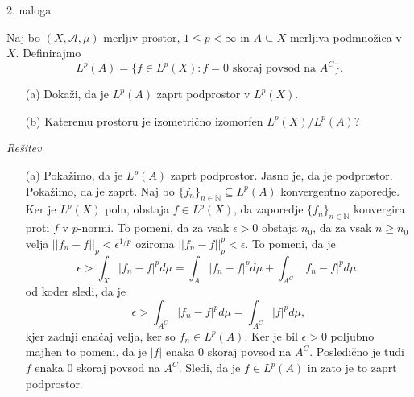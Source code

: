 \documentclass[a4paper, 12pt]{article}
\newcommand{\N}{\mathbb{N}}
\begin{document}
\begin{flushleft}
2. naloga
\end{flushleft}
Naj bo $(X,\mathcal{A}, \mu )$ merljiv prostor, $1 \le p < \infty$ in $A\subseteq X$ merljiva podmnožica v $X$. Definirajmo
$$
L^p(A) = \{ f\in L^p(X): f = 0 \textrm{ skoraj povsod na } A^C\}.
$$
\begin{enumerate}
\item[(a)] Dokaži, da je $L^p(A)$ zaprt podprostor v $L^p(X)$.
\item[(b)] Kateremu prostoru je izometrično izomorfen $L^p(X) / L^p(A)$?
\end{enumerate}
\emph{Rešitev}
\begin{enumerate}
\item[(a)] Pokažimo, da je $L^p(A)$ zaprt podprostor. Jasno je, da je podprostor. Pokažimo, da je zaprt. Naj bo $\{f_n\}_{n\in \N} \subseteq L^p(A)$ konvergentno zaporedje. Ker je $L^p(X)$ poln, obstaja $f\in L^p(X)$, da zaporedje $\{f_n\}_{n\in\N}$ konvergira proti $f$ v $p$-normi. To pomeni, da za vsak $\epsilon > 0$ obstaja $n_0$, da za vsak $n\ge n_0$ velja $||f_n - f||_p < \epsilon^{1/p}$ oziroma $||f_n - f||_p^p < \epsilon$. To pomeni, da je 
$$
\epsilon > \int_X |f_n - f|^p d\mu = \int_A |f_n - f|^p d\mu + \int_{A^C} |f_n-f|^pd\mu, 
$$
od koder sledi, da je 
$$
\epsilon > \int_{A^C} |f_n-f|^pd\mu = \int_{A^C} |f|^pd\mu, 
$$
kjer zadnji enačaj velja, ker so $f_n \in L^p(A)$. Ker je bil $\epsilon>0$ poljubno majhen to pomeni, da je $|f|$ enaka 0 skoraj povsod na $A^C$. Posledično je tudi $f$ enaka 0 skoraj povsod na $A^C$. Sledi, da je $f\in L^p(A)$ in zato je to zaprt podprostor. 


\end{enumerate}
\end{document}
